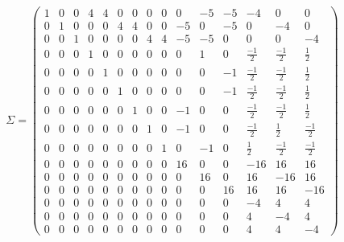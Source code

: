 \documentclass[proc]{edpsmath}
\begin{document}
  
\begin{equation*}
\Sigma = 
\begin{pmatrix}
	1 & 0 & 0 & 4 & 4 & 0 & 0 & 0 & 0 & 0 & -5 & -5 & -4 & 0 & 0  \\
	0 & 1 & 0 & 0 & 0 & 4 & 4 & 0 & 0 & -5 &  0 & -5 & 0 & -4 & 0  \\
	0 & 0 & 1 & 0 & 0 & 0 & 0 & 4 & 4 & -5 & -5 &  0 & 0 & 0 & -4  \\
	0 & 0 & 0 & 1 & 0 & 0 & 0 & 0 & 0 &  0 &  1 &  0 & \frac{-1}{2} & \frac{-1}{2} & \frac{1}{2}  \\
	0 & 0 & 0 & 0 & 1 & 0 & 0 & 0 & 0 &  0 &  0 & -1 & \frac{-1}{2} & \frac{-1}{2} & \frac{1}{2}  \\
	0 & 0 & 0 & 0 & 0 & 1 & 0 & 0 & 0 &  0 &  0 & -1 & \frac{-1}{2} & \frac{-1}{2} & \frac{1}{2}  \\
	0 & 0 & 0 & 0 & 0 & 0 & 1 & 0 & 0 & -1 &  0 &  0 & \frac{-1}{2} & \frac{-1}{2} & \frac{1}{2}  \\
	0 & 0 & 0 & 0 & 0 & 0 & 0 & 1 & 0 & -1 &  0 &  0 & \frac{-1}{2} & \frac{1}{2} & \frac{-1}{2}  \\
	0 & 0 & 0 & 0 & 0 & 0 & 0 & 0 & 1 &  0 & -1 &  0 & \frac{1}{2} & \frac{-1}{2} & \frac{-1}{2}  \\
	0 & 0 & 0 & 0 & 0 & 0 & 0 & 0 & 0 & 16 &  0 &  0 &-16 & 16 & 16 \\
	0 & 0 & 0 & 0 & 0 & 0 & 0 & 0 & 0 &  0 & 16 &  0 & 16 &-16 & 16 \\
	0 & 0 & 0 & 0 & 0 & 0 & 0 & 0 & 0 &  0 &  0 &  16 & 16 & 16 &-16 \\
	0 & 0 & 0 & 0 & 0 & 0 & 0 & 0 & 0 &  0 &  0 &  0 &-4 & 4 & 4  \\
	0 & 0 & 0 & 0 & 0 & 0 & 0 & 0 & 0 &  0 &  0 &  0 & 4 &-4 & 4  \\
	0 & 0 & 0 & 0 & 0 & 0 & 0 & 0 & 0 &  0 &  0 &  0 & 4 & 4 &-4  
\end{pmatrix}
\end{equation*}
%
%
\end{document}
